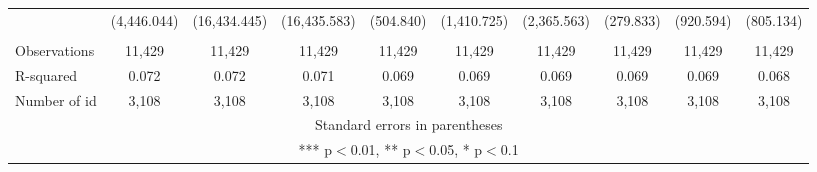 \documentclass[]{article}
\begin{document}
\begin{tabular}{lccccccccc}
 & (4,446.044) & (16,434.445) & (16,435.583) & (504.840) & (1,410.725) & (2,365.563) & (279.833) & (920.594) & (805.134) \\
 &  &  &  &  &  &  &  &  &  \\
Observations & 11,429 & 11,429 & 11,429 & 11,429 & 11,429 & 11,429 & 11,429 & 11,429 & 11,429 \\
R-squared & 0.072 & 0.072 & 0.071 & 0.069 & 0.069 & 0.069 & 0.069 & 0.069 & 0.068 \\
 Number of id & 3,108 & 3,108 & 3,108 & 3,108 & 3,108 & 3,108 & 3,108 & 3,108 & 3,108 \\ \hline
\multicolumn{10}{c}{ Standard errors in parentheses} \\
\multicolumn{10}{c}{ *** p$<$0.01, ** p$<$0.05, * p$<$0.1} \\
\end{tabular}
\end{document}
